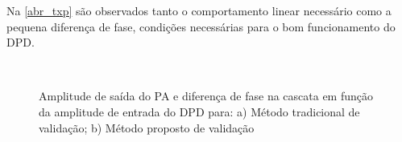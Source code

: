 {Na \autoref{abr_txp} são observados tanto o comportamento linear necessário como a pequena diferença de fase, condições necessárias para o bom funcionamento do DPD.}

\begin{figure}[H]
\centering
{}\\
\caption{Amplitude de saída do PA e diferença de fase na cascata em função da amplitude de entrada do DPD para: a) Método tradicional de validação; b) Método proposto de validação}
\label{abr_txp}
\end{figure}

